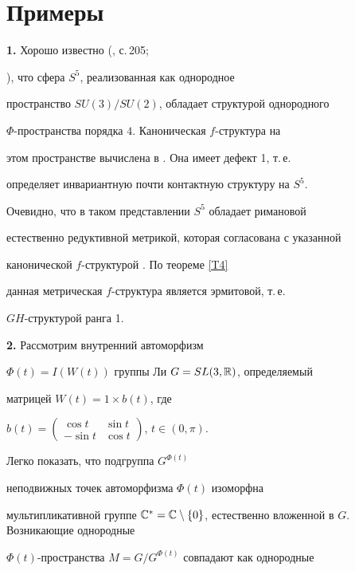 \section{Примеры}





{\bf 1.} Хорошо известно (\cite{27}, с.\,205;


\cite{San}), что сфера $S^5$, реализованная как однородное


пространство $SU(3)/SU(2)$, обладает структурой однородного


$\Phi$-пространства порядка $4$. Каноническая $f$-структура на


этом пространстве вычислена в \cite{13}. Она имеет дефект 1, т.\,е.


определяет инвариантную почти контактную структуру на $S^5$.


Очевидно, что в таком представлении $S^5$ обладает римановой


естественно редуктивной метрикой, которая согласована с указанной


канонической $f$-структурой \cite{28}. По теореме \ref{T4}


данная метрическая $f$-структура является эрмитовой, т.\,е.


$GH$-структурой ранга 1.


\medskip





{\bf 2.} Рассмотрим внутренний автоморфизм


$\Phi(t)=I(W(t))$ группы Ли $G=SL(3,\Bbb{R})$, определяемый


матрицей $W(t)=1\times b(t)$, где


$b(t)=\left(\begin{smallmatrix}


\cos{t} & \sin{t} \\   -\sin{t} & \cos{t}


\end{smallmatrix}\right)$, $t\in(0,\pi)$. 


Легко показать, что подгруппа $G^{\Phi(t)}$


неподвижных точек автоморфизма $\Phi(t)$ изоморфна


мультипликативной группе $\Bbb{C}^* = \Bbb{C} \setminus \{


0 \}$, естественно вложенной в $G$. Возникающие однородные


$\Phi(t)$-пространства $M=G/G^{\Phi(t)}$ совпадают как однородные


